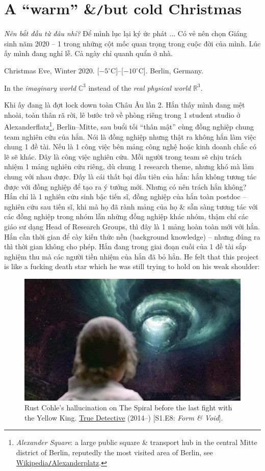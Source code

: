 \documentclass[12pt,oneside]{book}
\begin{document}
\section{A ``warm'' \&{\tt/}but cold Christmas}
{\it Nên bắt đầu từ đâu nhỉ?} Để mình lục lại ký ức phát $\ldots$ Có vẻ nên chọn Giáng sinh năm 2020 -- 1 trong những cột mốc quan trọng trong cuộc đời của mình. Lúc ấy mình đang nghỉ lễ. Cả ngày chỉ quanh quẩn ở nhà.
\begin{flushright}
	Christmas Eve, Winter 2020. [$-5^\circ$C]--[$-10^\circ$C]. Berlin, Germany.
	
	In the {\it imaginary world} $\mathbb{C}^3$ instead of the {\it real physical world} $\mathbb{R}^3$.
\end{flushright}
Khi ấy đang là đợt lock down toàn Châu Âu lần 2.
Hắn thấy mình đang mệt nhoài, toàn thân rã rời, lê bước trở về phòng riêng trong 1 student studio ở Alexanderflatz\footnote{ {\it Alexander Square}: a large public square \& transport hub in the central Mitte district of Berlin, reputedly the most visited area of Berlin, see \href{https://en.wikipedia.org/wiki/Alexanderplatz}{Wikipedia{\tt/}Alexanderplatz}.}, Berlin--Mitte, sau buổi tối ``thân mật'' cùng đồng nghiệp chung team nghiên cứu của hắn. Nói là đồng nghiệp nhưng thật ra không hắn làm việc chung 1 đề tài. Nếu là 1 công việc bên mảng công nghệ hoặc kinh doanh chắc có lẽ sẽ khác. Đây là công việc nghiên cứu. Mỗi người trong team sẽ chịu trách nhiệm 1 mảng nghiên cứu riêng, dù chung 1 research theme, nhưng khó mà làm chung với nhau được. Đấy là cái thất bại đầu tiên của hắn: hắn không tương tác được với đồng nghiệp để tạo ra ý tưởng mới. Nhưng có nên trách hắn không? Hắn chỉ là 1 nghiên cứu sinh bậc tiến sĩ, đồng nghiệp của hắn toàn postdoc -- nghiên cứu sau tiến sĩ, khi mà họ đã rành mảng của họ \& sẵn sàng tương tác với các đồng nghiệp trong nhóm lẫn những đồng nghiệp khác nhóm, thậm chí các giáo sư dạng Head of Research Groups, thì đây là 1 mảng hoàn toàn mới với hắn. Hắn cần thời gian để cày kiến thức nền (background knowledge) -- nhưng đúng ra thì thời gian không cho phép. Hắn đang trong giai đoạn cuối của 1 đề tài sắp nghiệm thu mà các người tiền nhiệm của hắn đã bỏ hẳn. He felt that this project is like a fucking death star which he was still trying to hold on his weak shoulder:
\begin{figure}[H]
	\centering
	\includegraphics[width = 12cm]{spiral}
	\caption{{\sf Rust Cohle}'s hallucination on The Spiral before the last fight with the {\sf Yellow King}. \href{https://www.imdb.com/title/tt2356777/}{True Detective} (2014--) [S1.E8: {\it Form \& Void}].}
\end{figure}
\end{document}
